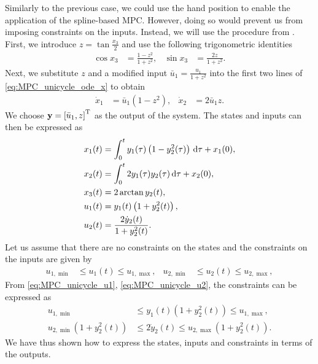 Similarly to the previous case, we could use the hand position to enable the application of the spline-based MPC.
However, doing so would prevent us from imposing constraints on the inputs.
Instead, we will use the procedure from \cite{van_parys_2017_DMPC}.
First, we introduce $z = \tan \frac{x_3}{2}$ and use the following trigonometric identities 
\begin{align}
    \cos x_3 &= \frac{1 - z^2}{1 + z^2}, &
    \sin x_3 &= \frac{2z}{1 + z^2}. 
\end{align}
Next, we substitute $z$ and a modified input $\bar{u}_1 = \frac{u_1}{1 + z^2}$ into the first two lines of \eqref{eq:MPC_unicycle_ode_x} to obtain 
\begin{align}
    \dot{x}_1 &= \bar{u}_1 \left(1 - z^2\right), &
    \dot{x}_2 &= 2 \bar{u}_1 z. 
\end{align}
We choose $\mathbf{y} = \left[\bar{u}_1, z\right]^{\mathrm{T}}$ as the output of the system.
The states and inputs can then be expressed as 
\begin{subequations}
    \begin{align}
        x_1(t) &= \int_{0}^t y_1(\tau) \left(1 - y_2^2(\tau)\right)\, {\rm d}\tau + x_1(0), \\
        x_2(t) &= \int_{0}^t 2 y_1(\tau) y_2(\tau)\, {\rm d}\tau + x_2(0), \\
        x_3(t) &= 2 \arctan y_2(t), \\
        u_1(t) &= y_1(t) \left(1 + y_2^2(t)\right), \label{eq:MPC_unicycle_u1} \\
        u_2(t) &= \frac{2 \dot{y}_2(t)}{1 + y_2^2(t)}. \label{eq:MPC_unicycle_u2}
    \end{align} \label{eq:MPC_unicycle_transform} 
\end{subequations}
Let us assume that there are no constraints on the states and the constraints on the inputs are given by
\begin{align}
    u_{1, \min} &\leq u_1(t) \leq u_{1, \max}, &
    u_{2, \min} &\leq u_2(t) \leq u_{2, \max},
\end{align}
From \eqref{eq:MPC_unicycle_u1}, \eqref{eq:MPC_unicycle_u2}, the constraints can be expressed as
\begin{subequations}
    \begin{align}
        u_{1, \min} &\leq y_1(t) \left(1 + y_2^2(t)\right) \leq u_{1, \max}, \\
        u_{2, \min}\left(1 + y_2^2(t)\right) &\leq 2 \dot{y}_2(t) \leq u_{2, \max}\left(1 + y_2^2(t)\right).
    \end{align}
\end{subequations}
We have thus shown how to express the states, inputs and constraints in terms of the outputs.

